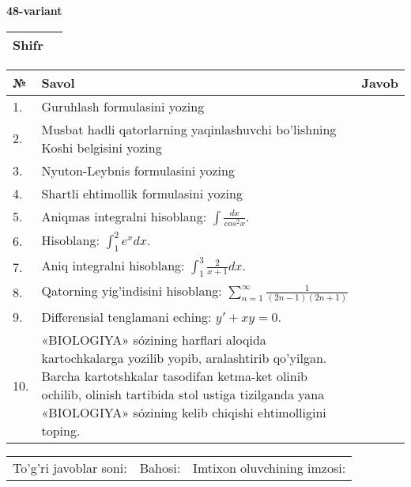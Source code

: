 \documentclass{article}
\begin{document}
  \egroup
  
  \newpage
  
  
  \textbf{48-variant}\\
  
  \bgroup
  \def\arraystretch{1.6} %
  
  \begin{tabular}{|m{5.7cm}|m{9.5cm}|}
  \hline
  Shifr & \\
  \hline
  \end{tabular}
  
  \vspace{1cm}
  
  \begin{tabular}{|m{0.7cm}|m{10cm}|m{4cm}|}
  \hline
  № & Savol & Javob \\
  \hline
  1. & Guruhlash formulasini yozing &  \\
  \hline
  2. & Musbat hadli qatorlarning yaqinlashuvchi bo'lishning Koshi belgisini yozing &  \\
  \hline
  3. & Nyuton-Leybnis formulasini yozing &  \\
  \hline
  4. & Shartli ehtimollik formulasini yozing &  \\
  \hline
  5. & Aniqmas integralni hisoblang: \(\int \frac{dx}{cos^{2}x}\). &  \\
  \hline
  6. & Hisoblang: \(\int_{1}^{2}{e^{x}dx}\). &  \\
  \hline
  7. & Aniq integralni hisoblang: \(\int_{1}^{3}\frac{2}{x + 1}dx\). &  \\
  \hline
  8. & Qatorning yig'indisini hisoblang: \(\sum_{n = 1}^{\infty}\frac{1}{(2n - 1)(2n + 1)}\) &  \\
  \hline
  9. & Differensial tenglamani eching: \(y' + xy = 0\). &  \\
  \hline
  10. & «BIOLOGIYA» sózining harflari aloqida kartochkalarga yozilib yopib, aralashtirib qo'yilgan. Barcha kartotshkalar tasodifan ketma-ket olinib ochilib, olinish tartibida stol ustiga tizilganda yana «BIOLOGIYA» sózining kelib chiqishi ehtimolligini toping. &  \\
  \hline
  \end{tabular}
  
  \vspace{1cm}
  
  \begin{tabular}{lll}
  To'g'ri javoblar soni: \underline{\hspace{1.5cm}} & 
  Bahosi: \underline{\hspace{1.5cm}} & 
  Imtixon oluvchining imzosi: \underline{\hspace{2cm}} \\
  \end{tabular}
  
\end{document}
